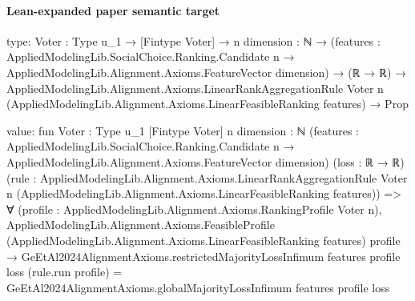 \documentclass[10pt]{article}
\begin{document}
\paragraph{Lean-expanded paper semantic target}
\begin{ReviewVerbatim}
type:
{Voter : Type u_1} →
  [Fintype Voter] →
    {n dimension : ℕ} →
      (features :
          AppliedModelingLib.SocialChoice.Ranking.Candidate n →
            AppliedModelingLib.Alignment.Axioms.FeatureVector dimension) →
        (ℝ → ℝ) →
          AppliedModelingLib.Alignment.Axioms.LinearRankAggregationRule Voter n
              (AppliedModelingLib.Alignment.Axioms.LinearFeasibleRanking features) →
            Prop

value:
fun {Voter : Type u_1} [Fintype Voter] {n dimension : ℕ}
    (features :
      AppliedModelingLib.SocialChoice.Ranking.Candidate n → AppliedModelingLib.Alignment.Axioms.FeatureVector dimension)
    (loss : ℝ → ℝ)
    (rule :
      AppliedModelingLib.Alignment.Axioms.LinearRankAggregationRule Voter n
        (AppliedModelingLib.Alignment.Axioms.LinearFeasibleRanking features)) =>
  ∀ (profile : AppliedModelingLib.Alignment.Axioms.RankingProfile Voter n),
    AppliedModelingLib.Alignment.Axioms.FeasibleProfile
        (AppliedModelingLib.Alignment.Axioms.LinearFeasibleRanking features) profile →
      GeEtAl2024AlignmentAxioms.restrictedMajorityLossInfimum features profile loss (rule.run profile) =
        GeEtAl2024AlignmentAxioms.globalMajorityLossInfimum features profile loss
\end{ReviewVerbatim}
\end{document}
